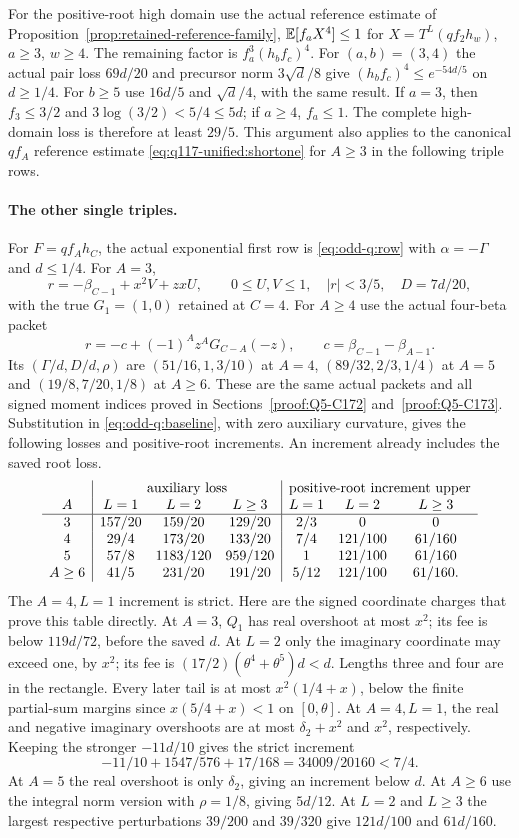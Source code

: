 For the positive-root high domain use the actual reference
estimate of Proposition~\ref{prop:retained-reference-family},
$\mathbb E[f_a X^4]\le1$ for $X=T^L(qf_2h_w)$, $a\ge3$, $w\ge4$.
The remaining factor is $f_a^3(h_bf_c)^4$.
For $(a,b)=(3,4)$ the actual pair loss $69d/20$ and precursor
norm $3\sqrt d/8$ give $(h_bf_c)^4\le e^{-54d/5}$ on
$d\ge1/4$. For $b\ge5$ use $16d/5$ and $\sqrt d/4$, with
the same result. If $a=3$, then $f_3\le3/2$ and
$3\log(3/2)<5/4\le5d$; if $a\ge4$, $f_a\le1$.
The complete high-domain loss is therefore at least $29/5$.
This argument also applies to the canonical $qf_A$ reference
estimate \eqref{eq:q117-unified:shortone} for $A\ge3$ in the
following triple rows.

\paragraph{The other single triples.}
For $F=qf_Ah_C$, the actual exponential first row is
\eqref{eq:odd-q:row} with $\alpha=-\Gamma$ and $d\le1/4$.
For $A=3$,
\[
 r=-\beta_{C-1}+x^2V+zxU,
 \qquad 0\le U,V\le1,\quad |r|<3/5,\quad D=7d/20,
\]
with the true $G_1=(1,0)$ retained at $C=4$.
For $A\ge4$ use the actual four-beta packet
\[
 r=-c+(-1)^A z^A G_{C-A}(-z),\qquad
 c=\beta_{C-1}-\beta_{A-1}.
\]
Its $(\Gamma/d,D/d,\rho)$ are
$(51/16,1,3/10)$ at $A=4$,
$(89/32,2/3,1/4)$ at $A=5$ and
$(19/8,7/20,1/8)$ at $A\ge6$.
These are the same actual packets and all signed moment indices
proved in Sections~\ref{proof:Q5-C172} and~\ref{proof:Q5-C173}.
Substitution in \eqref{eq:odd-q:baseline}, with zero auxiliary
curvature, gives the following losses and positive-root increments.
An increment already includes the saved root loss.
\[
\begin{array}{c|ccc|ccc}
 &\multicolumn{3}{c|}{\text{auxiliary loss}}
 &\multicolumn{3}{c}{\text{positive-root increment upper}}\\
 A&L=1&L=2&L\ge3&L=1&L=2&L\ge3\\\hline
 3&157/20&159/20&129/20&2/3&0&0\\
 4&29/4&173/20&133/20&7/4&121/100&61/160\\
 5&57/8&1183/120&959/120&1&121/100&61/160\\
 A\ge6&41/5&231/20&191/20&5/12&121/100&61/160.
\end{array}
\]
The $A=4,L=1$ increment is strict. Here are the signed
coordinate charges that prove this table directly.
At $A=3$, $Q_1$ has real overshoot at most $x^2$;
its fee is below $119d/72$, before the saved $d$.
At $L=2$ only the imaginary coordinate may exceed one, by $x^2$;
its fee is $(17/2)(\theta^4+\theta^5)d<d$.
Lengths three and four are in the rectangle. Every later tail is
at most $x^2(1/4+x)$, below the finite partial-sum margins since
$x(5/4+x)<1$ on $[0,\theta]$.
At $A=4,L=1$, the real and negative imaginary overshoots are
at most $\delta_2+x^2$ and $x^2$, respectively. Keeping the
stronger $-11d/10$ gives the strict increment
\[
 -11/10+1547/576+17/168=34009/20160<7/4.
\]
At $A=5$ the real overshoot is only $\delta_2$, giving an
increment below $d$. At $A\ge6$ use the integral norm version
with $\rho=1/8$, giving $5d/12$.
At $L=2$ and $L\ge3$ the largest respective perturbations
$39/200$ and $39/320$ give $121d/100$ and $61d/160$.

